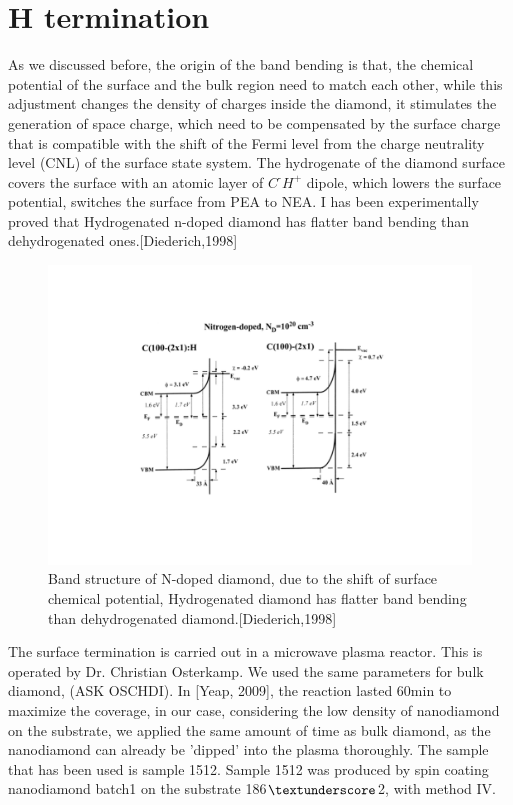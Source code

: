 
\section[H termination]{H termination}
As we discussed before, the origin of the band bending is that, the chemical potential of the surface and the bulk region need to match each other, while this adjustment changes the density of charges inside the diamond, it stimulates the generation of space charge, which need to be compensated by the surface charge that is compatible with the shift of the Fermi level from the charge neutrality level (CNL) of the surface state system. The hydrogenate of the diamond surface covers the surface with an atomic layer of $C^{\text{-}} H^{+}$ dipole, which lowers the surface potential, switches the surface from PEA to NEA. I has been experimentally proved that Hydrogenated n-doped diamond has flatter band bending than dehydrogenated ones.[Diederich,1998] 



\FloatBarrier
\begin{figure}[h]
\centering
\includegraphics[width=0.7\linewidth]{Figures/pic/Htermination}
\caption{Band structure of N-doped diamond, due to the shift of surface chemical potential, Hydrogenated diamond has flatter band bending than dehydrogenated diamond.[Diederich,1998]}
\label{fig:wp20160921210516proli}
\end{figure}
\FloatBarrier

The surface termination is carried out in a microwave plasma reactor. This is operated by Dr. Christian Osterkamp. We used the same parameters for bulk diamond, (ASK OSCHDI). In [Yeap, 2009], the reaction lasted 60min to maximize the coverage, in our case, considering the low density of nanodiamond on the substrate, we applied the same amount of time as bulk diamond, as the nanodiamond can already be 'dipped' into the plasma thoroughly. The sample that has been used is sample 1512. Sample 1512 was produced by spin coating nanodiamond batch1 on the substrate 186$\textunderscore$2, with method IV.

